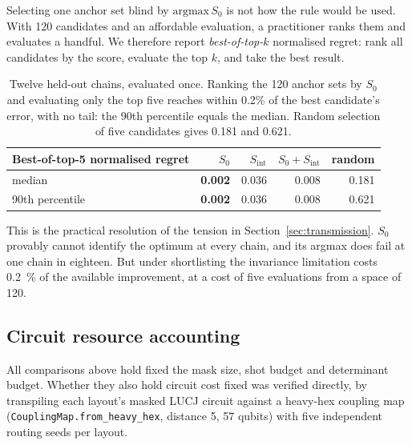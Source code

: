 \documentclass[11pt,a4paper]{article}
\begin{document}
Selecting one anchor set blind by $\mathrm{argmax}\,S_0$ is not how the rule
would be used. With 120 candidates and an affordable evaluation, a
practitioner ranks them and evaluates a handful. We therefore report
\emph{best-of-top-$k$} normalised regret: rank all candidates by the score,
evaluate the top $k$, and take the best result.

\begin{table}[htbp]\centering\small
\begin{tabular}{lrrrr}
\toprule
Best-of-top-5 normalised regret & $S_0$ & $S_{\text{int}}$ & $S_0+S_{\text{int}}$ & random\\
\midrule
median & \textbf{0.002} & 0.036 & 0.008 & 0.181\\
90th percentile & \textbf{0.002} & 0.036 & 0.008 & 0.621\\
\bottomrule
\end{tabular}
\caption{Twelve held-out chains, evaluated once. Ranking the 120 anchor sets
by $S_0$ and evaluating only the top five reaches within 0.2\% of the best
candidate's error, with no tail: the 90th percentile equals the median.
Random selection of five candidates gives 0.181 and 0.621.}
\end{table}

This is the practical resolution of the tension in
Section~\ref{sec:transmission}. $S_0$ provably cannot identify the optimum at
every chain, and its argmax does fail at one chain in eighteen. But under
shortlisting the invariance limitation costs \SI{0.2}{\percent} of the
available improvement, at a cost of five evaluations from a space of 120.

\FloatBarrier
\subsection{Circuit resource accounting}
\label{sec:resources}

All comparisons above hold fixed the mask size, shot budget and determinant
budget. Whether they also hold circuit cost fixed was verified directly, by
transpiling each layout's masked LUCJ circuit against a heavy-hex coupling
map (\texttt{CouplingMap.from\_heavy\_hex}, distance 5, 57 qubits) with five
independent routing seeds per layout.
\end{document}
